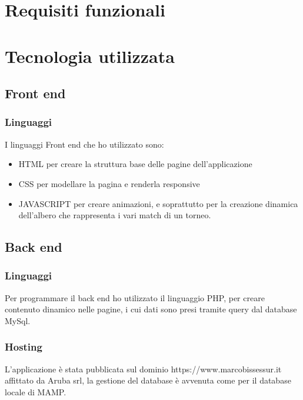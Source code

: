 \documentclass{article}
\begin{document}
\section{Requisiti funzionali}

    \section{Tecnologia utilizzata}
    \subsection{Front end}
    \subsubsection{Linguaggi}
 I linguaggi Front end che ho utilizzato sono:
 \begin{itemize}
    \item HTML per creare la struttura base delle pagine dell'applicazione
    \item CSS per modellare la pagina e renderla responsive 
    \item JAVASCRIPT per creare animazioni, e soprattutto per la creazione dinamica
    dell'albero che rappresenta i vari match di un torneo.
  \end{itemize}
    \subsection{Back end}
    \subsubsection{Linguaggi}
Per programmare il back end ho utilizzato il linguaggio PHP, per creare contenuto
dinamico nelle pagine, i cui dati sono presi tramite query
dal database MySql.
\subsubsection{Hosting}
L'applicazione è stata pubblicata sul dominio https://www.marcobissessur.it affittato
da Aruba srl, la gestione del database è avvenuta come per il 
database locale di MAMP.
\end{document}
